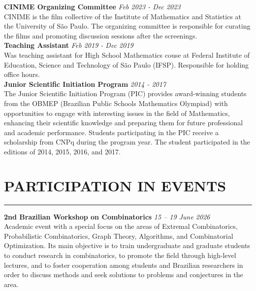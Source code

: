 \documentclass[a4paper,10pt]{article}
\begin{document}
\noindent\textbf{CINIME Organizing Committee} \hfill  \textit{Feb 2023 - Dec 2023}\\
CINIME is the film collective of the Institute of Mathematics and Statistics at the University of São Paulo. The organizing committee is responsible for curating the films and promoting discussion sessions after the screenings. \\

\noindent\textbf{Teaching Assistant} \hfill  \textit{Feb 2019 - Dec 2019}\\
Was teaching assistant for High School Mathematics couse at  Federal Institute of Education, Science and Technology of São Paulo (IFSP). Responsible for holding office hours. \\

\noindent\textbf{Junior Scientific Initiation Program} \hfill \textit{2014 - 2017} \\
The Junior Scientific Initiation Program (PIC) provides award-winning students from the OBMEP (Brazilian Public Schools Mathematics Olympiad) with opportunities to engage with interesting issues in the field of Mathematics, enhancing their scientific knowledge and preparing them for future professional and academic performance. Students participating in the PIC receive a scholarship from CNPq during the program year. The student participated in the editions of 2014, 2015, 2016, and 2017.


\vspace{0.2cm}
\section*{PARTICIPATION IN EVENTS}
\vspace{-1.5em} %
\noindent\rule{\textwidth}{0.4pt} %

\noindent\textbf{2nd Brazilian Workshop on Combinatorics} \hfill \textit{15 -- 19 June 2026}\\
Academic event with a special focus on the areas of Extremal Combinatorics, Probabilistic Combinatorics, Graph Theory, Algorithms, and Combinatorial Optimization. Its main objective is to train undergraduate and graduate students to conduct research in combinatorics, to promote the field through high-level lectures, and to foster cooperation among students and Brazilian researchers in order to discuss methods and seek solutions to problems and conjectures in the area.  \\
\end{document}
